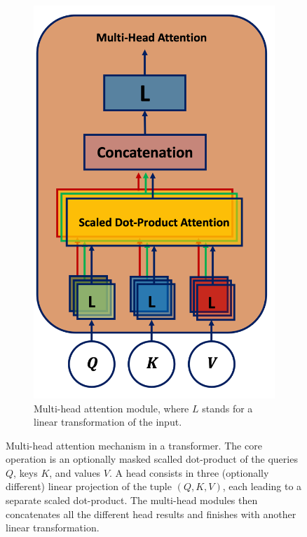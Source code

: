 \begin{figure}[h!]
\begin{subfigure}[b]{0.5\textwidth}
        \includegraphics[scale=0.65]{Images/ML/multiHeadAtt.png}
        \caption{Multi-head attention module, where $L$ stands for a linear transformation of the input.} 
        \label{fig:mulitheadAtt}
    \end{subfigure}
    \caption{Multi-head attention mechanism in a transformer. The core operation is an optionally masked scalled dot-product of the queries $Q$, keys $K$, and values $V$. A head consists in three (optionally different) linear projection of the tuple $(Q, K, V)$, each leading to a separate scaled dot-product. The multi-head modules then concatenates all the different head results and finishes with another linear transformation.}
    \label{fig:transAtt}
\end{figure} 


